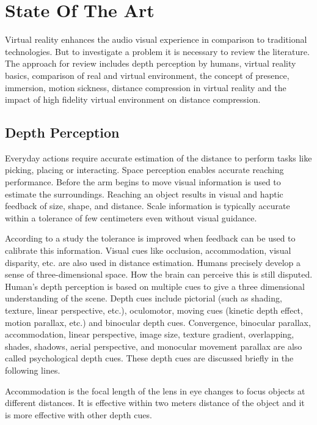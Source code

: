 \let\cleardoublepage\clearpage


\chapter{State Of The Art}
\label{sec:State Of The Art}
Virtual reality enhances the audio visual experience in comparison to traditional technologies. But to investigate a problem it is necessary to review the literature. The approach for review includes depth perception by humans, virtual reality basics, comparison of real and virtual environment, the concept of presence, immersion, motion sickness, distance compression in virtual reality and the impact of high fidelity virtual environment on distance compression.
\section{Depth Perception}
Everyday actions require accurate estimation of the distance to perform tasks like picking, placing or interacting. Space perception enables accurate reaching performance. Before the arm begins to move visual information is used to estimate the surroundings. Reaching an object results in visual and haptic feedback of size, shape, and distance. Scale information is typically accurate within a tolerance of few centimeters even without visual guidance. \cite{bingham2000distortions}\par 
According to a study the tolerance is improved when feedback can be used to calibrate this information. Visual cues like occlusion, accommodation, visual disparity, etc. are also used in distance estimation\cite{armbruster2005distance}.
Humans precisely develop a sense of three-dimensional space. How the brain can perceive this is still disputed. Human's depth perception is based on multiple cues to give a three dimensional understanding of the scene. Depth cues include pictorial (such as shading, texture, linear perspective, etc.), oculomotor, moving cues (kinetic depth effect, motion parallax, etc.) and binocular depth cues. Convergence, binocular parallax, accommodation, linear perspective, image size, texture gradient, overlapping, shades, shadows, aerial perspective, and monocular movement parallax are also called psychological depth cues\cite{armbruster2005distance}. These depth cues are discussed briefly in the following lines.\par
Accommodation is the focal length of the lens in eye changes to focus objects at different distances. It is effective within two meters distance of the object and it is more effective with other depth cues.
